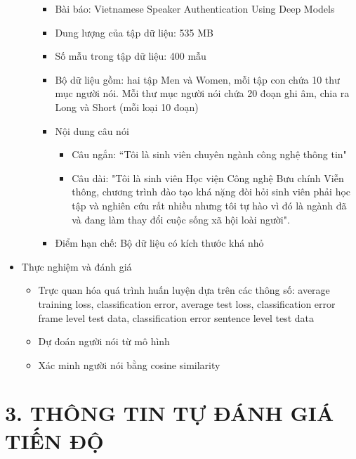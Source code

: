 \documentclass{article}
\begin{document}
\begin{itemize}
\begin{itemize}
\begin{itemize}
				\item Bài báo: Vietnamese Speaker Authentication Using Deep Models
				\item Dung lượng của tập dữ liệu: 535 MB
				\item Số mẫu trong tập dữ liệu: 400 mẫu
				\item Bộ dữ liệu gồm: hai tập  Men và Women, mỗi tập con chứa 10 thư mục người nói. Mỗi thư mục người nói chứa 20 đoạn ghi âm, chia ra Long và Short (mỗi loại 10 đoạn) 
				\item Nội dung câu nói
				\begin{itemize}
					\item Câu ngắn: “Tôi là sinh viên chuyên ngành công nghệ thông tin"
					\item Câu dài: "Tôi là sinh viên Học viện Công nghệ Bưu chính Viễn thông, chương trình đào tạo khá nặng đòi hỏi sinh viên phải học tập và nghiên cứu rất nhiều nhưng tôi tự hào vì đó là ngành đã và đang làm thay đổi cuộc sống xã hội loài người".
				\end{itemize}
				\item Điểm hạn chế: Bộ dữ liệu có kích thước khá nhỏ
			\end{itemize}
		\end{itemize}
		
		
		\item Thực nghiệm và đánh giá
		\begin{itemize}
			\item Trực quan hóa quá trình huấn luyện dựa trên các thông số: average training loss, classification error, average test loss, classification error frame level test data, classification error sentence level test data
			\item Dự đoán người nói từ mô hình
			\item Xác minh người nói bằng cosine similarity
		\end{itemize}
	\end{itemize}
	
	\section{3.	THÔNG TIN TỰ ĐÁNH GIÁ TIẾN ĐỘ}
\end{document}
